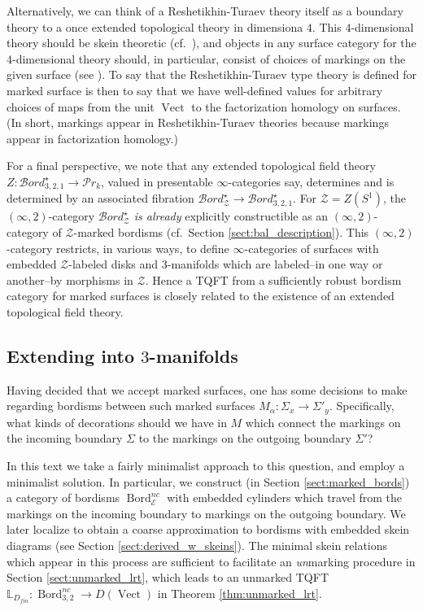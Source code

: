 \documentclass[reqno]{amsart}
\theoremstyle{definition}
\newcommand{\mbb}[1]{\mathbb{#1}}
\newcommand{\mcl}[1]{\mathcal{#1}}
\newcommand{\msc}[1]{\mathscr{#1}}
\newcommand{\opn}[1]{\operatorname{#1}}
\DeclareMathOperator{\Bord}{Bord}
\renewcommand{\1}{\mathbf{1}}
\begin{document}
Alternatively, we can think of a Reshetikhin-Turaev theory itself as a boundary theory to a once extended topological theory in dimensiona $4$. This $4$-dimensional theory should be skein theoretic (cf.\ \cite{brownhaioun,costantinoetalII,haioun}), and objects in any surface category for the $4$-dimensional theory should, in particular, consist of choices of markings on the given surface (see \cite{brownhaioun}). To say that the Reshetikhin-Turaev type theory is defined for marked surface is then to say that we have well-defined values for arbitrary choices of maps from the unit $\opn{Vect}$ to the factorization homology on surfaces. (In short, markings appear in Reshetikhin-Turaev theories because markings appear in factorization homology.)

For a final perspective, we note that any extended topological field theory $Z:\mcl{B}ord^{\star}_{3,2,1}\to \msc{P}\!r_k$, valued in presentable $\infty$-categories say, determines and is determined by an associated fibration $\mcl{B}ord^{\star}_{\msc{Z}}\to \mcl{B}ord^{\star}_{3,2,1}$. For $\msc{Z}=Z(S^1)$, the $(\infty,2)$-category $\mcl{B}ord^{\star}_{\msc{Z}}$ \emph{is already} explicitly constructible as an $(\infty,2)$-category of $\msc{Z}$-marked bordisms (cf.\ Section \ref{sect:bal_description}). This $(\infty,2)$-category restricts, in various ways, to define $\infty$-categories of surfaces with embedded $\msc{Z}$-labeled disks and $3$-manifolds which are labeled--in one way or another--by morphisms in $\msc{Z}$. Hence a TQFT from a sufficiently robust bordism category for marked surfaces is closely related to the existence of an extended topological field theory.

\subsection{Extending into $3$-manifolds}

Having decided that we accept marked surfaces, one has some decisions to make regarding bordisms between such marked surfaces $M_{\alpha}:\Sigma_x\to \Sigma'_y$. Specifically, what kinds of decorations should we have in $M$ which connect the markings on the incoming boundary $\Sigma$ to the markings on the outgoing boundary $\Sigma'$?
\par

In this text we take a fairly minimalist approach to this question, and employ a minimalist solution. In particular, we construct (in Section \ref{sect:marked_bords}) a category of bordisms $\Bord^{nc}_{\msc{E}}$ with embedded cylinders which travel from the markings on the incoming boundary to markings on the outgoing boundary. We later localize to obtain a coarse approximation to bordisms with embedded skein diagrams (see Section \ref{sect:derived_w_skeins}). The minimal skein relations which appear in this process are sufficient to facilitate an \emph{un}marking procedure in Section \ref{sect:unmarked_lrt}, which leads to an unmarked TQFT $\mbb{L}_{D_{fin}}:\opn{Bord}^{nc}_{3,2}\to D(\opn{Vect})$ in Theorem \ref{thm:unmarked_lrt}.
\par
\end{document}
